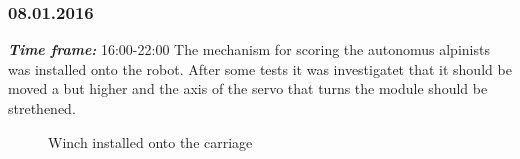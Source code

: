 \subsubsection{08.01.2016}
\textit{\textbf{Time frame:}} 16:00-22:00 \newline
The mechanism for scoring the autonomus alpinists was installed onto the robot. After some tests it was investigatet that it should be moved a but higher and the axis of the servo that turns the module should be strethened.

\begin{figure}[H]
	\begin{minipage}[h]{0.58\linewidth}
		\caption{Winch installed onto the carriage}
	\end{minipage}
	\hfill
	\begin{minipage}[h]{0.37\linewidth}

\end{minipage}
\end{figure}
